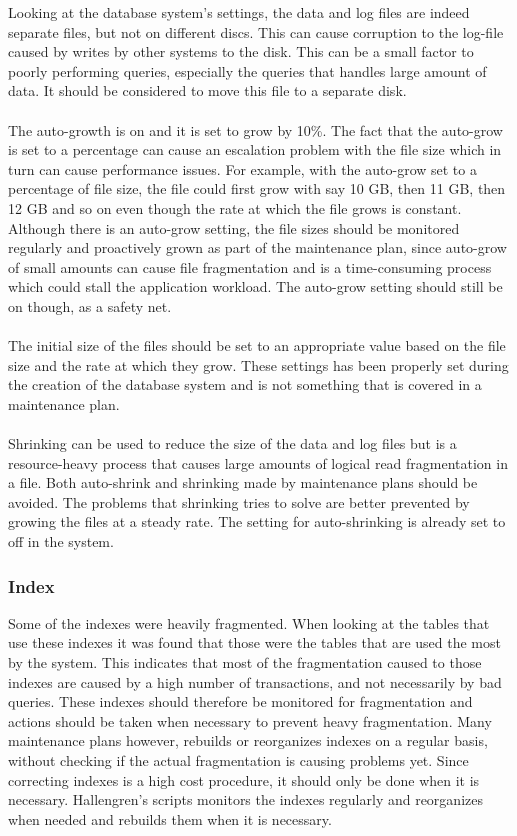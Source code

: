 \documentclass{cslthse-msc}
\begin{document}
Looking at the database system's settings, the data and log files are indeed separate files, but not on different discs. This can cause corruption to the log-file caused by writes by other systems to the disk. This can be a small factor to poorly performing queries, especially the queries that handles large amount of data. It should be considered to move this file to a separate disk. \\\\

The auto-growth is on and it is set to grow by 10\%. The fact that the auto-grow is set to a percentage can cause an escalation problem with the file size which in turn can cause performance issues. For example, with the auto-grow set to a percentage of file size, the file could first grow with say 10 GB, then 11 GB, then 12 GB and so on even though the rate at which the file grows is constant. Although there is an auto-grow setting, the file sizes should be monitored regularly and proactively grown as part of the maintenance plan, since auto-grow of small amounts can cause file fragmentation and is a time-consuming process which could stall the application workload. The auto-grow setting should still be on though, as a safety net. \\\\

The initial size of the files should be set to an appropriate value based on the file size and the rate at which they grow. These settings has been properly set during the creation of the database system and is not something that is covered in a maintenance plan.\\\\

Shrinking can be used to reduce the size of the data and log files but is a resource-heavy process that causes large amounts of logical read fragmentation in a file. Both auto-shrink and shrinking made by maintenance plans should be avoided. The problems that shrinking tries to solve are better prevented by growing the files at a steady rate. The setting for auto-shrinking is already set to off in the system.

\subsubsection{Index}
Some of the indexes were heavily fragmented. When looking at the tables that use these indexes it was found that those were the tables that are used the most by the system. This indicates that most of the fragmentation caused to those indexes are caused by a high number of transactions, and not necessarily by bad queries. These indexes should therefore be monitored for fragmentation and actions should be taken when necessary to prevent heavy fragmentation. Many maintenance plans however, rebuilds or reorganizes indexes on a regular basis, without checking if the actual fragmentation is causing problems yet. Since correcting indexes is a high cost procedure, it should only be done when it is necessary. Hallengren's \cite{Hallengren15} scripts monitors the indexes regularly and reorganizes when needed and rebuilds them when it is necessary.
\end{document}
